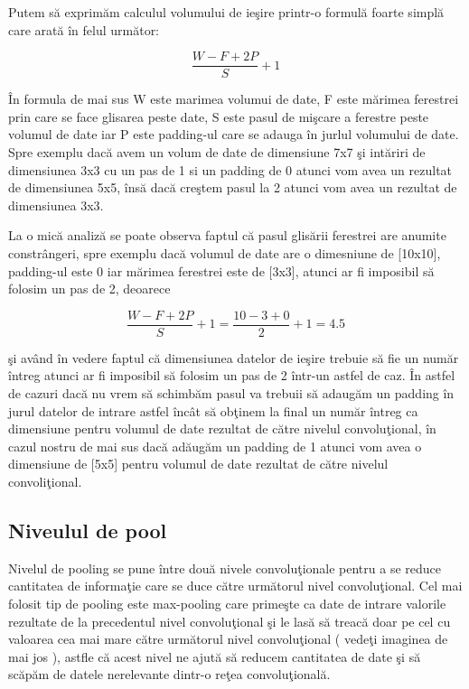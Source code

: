 Putem s\u{a} exprim\u{a}m calculul volumului de ie\c{s}ire printr-o formul\u{a} foarte simpl\u{a} care arat\u{a} \^{i}n felul urm\u{a}tor:

$$ \frac{W - F + 2P }{S} + 1 $$

\^{I}n formula de mai sus W este marimea volumui de date, F este m\u{a}rimea ferestrei prin care se face glisarea peste date, S este pasul de mi\c{s}care a ferestre peste volumul de date iar P este padding-ul care se adauga \^{i}n jurlul volumului de date. Spre exemplu dac\u{a} avem un volum de date de dimensiune 7x7 \c{s}i int\u{a}riri de dimensiunea 3x3 cu un pas de 1 si un padding de 0 atunci vom avea un rezultat de dimensiunea 5x5, \^{i}ns\u{a} dac\u{a} cre\c{s}tem pasul la 2 atunci vom avea un rezultat de dimensiunea 3x3.

\par

La o mic\u{a} analiz\u{a} se poate observa faptul c\u{a} pasul glis\u{a}rii ferestrei are anumite constr\^{a}ngeri, spre exemplu dac\u{a} volumul de date are o dimesniune de [10x10], padding-ul este 0 iar m\u{a}rimea ferestrei este de [3x3], atunci ar fi imposibil s\u{a} folosim un pas de 2, deoarece

$$ \frac{W - F + 2P }{S} + 1 = \frac{10 - 3 + 0 }{2} + 1 = 4.5 $$

\c{s}i av\^{a}nd \^{i}n vedere faptul c\u{a} dimensiunea datelor de ie\c{s}ire trebuie s\u{a} fie un num\u{a}r \^{i}ntreg atunci ar fi imposibil s\u{a} folosim un pas de 2 \^{i}ntr-un astfel de caz. \^{I}n astfel de cazuri dac\u{a} nu vrem s\u{a} schimb\u{a}m pasul va trebuii s\u{a} adaug\u{a}m un padding \^{i}n jurul datelor de intrare astfel \^{i}nc\^{a}t s\u{a} ob\c{t}inem la final un num\u{a}r \^{i}ntreg ca dimensiune pentru volumul de date rezultat de c\u{a}tre nivelul convolu\c{t}ional, \^{i}n cazul nostru de mai sus dac\u{a} ad\u{a}ug\u{a}m un padding de 1 atunci vom avea  o dimensiune de [5x5] pentru volumul de date rezultat de c\u{a}tre nivelul convoli\c{t}ional.

\subsection{Niveulul de pool}

Nivelul de pooling se pune \^{i}ntre dou\u{a} nivele convolu\c{t}ionale pentru a se reduce cantitatea de informa\c{t}ie care se duce c\u{a}tre urm\u{a}torul nivel convolu\c{t}ional. Cel mai folosit tip de pooling este max-pooling care prime\c{s}te ca date de intrare valorile rezultate de la precedentul nivel convolu\c{t}ional \c{s}i le las\u{a} s\u{a} treac\u{a} doar pe cel cu valoarea cea mai mare c\u{a}tre urm\u{a}torul nivel convolu\c{t}ional ( vede\c{t}i imaginea de mai jos ), astfle c\u{a} acest nivel ne ajut\u{a} s\u{a} reducem cantitatea de date \c{s}i s\u{a} sc\u{a}p\u{a}m de datele nerelevante dintr-o re\c{t}ea convolu\c{t}ional\u{a}. 

